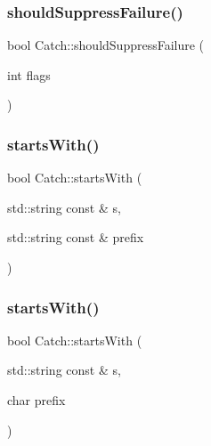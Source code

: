\mbox{\label{namespaceCatch_ab91eb13081203d634fe48d3d2ab386d7}} 
\subsubsection{\texorpdfstring{should\+Suppress\+Failure()}{shouldSuppressFailure()}}
{\footnotesize\ttfamily bool Catch\+::should\+Suppress\+Failure (\begin{DoxyParamCaption}\item[{int}]{flags }\end{DoxyParamCaption})}

\mbox{\label{namespaceCatch_a695f62327be0676e046291eeaae15110}} 
\subsubsection{\texorpdfstring{starts\+With()}{startsWith()}\hspace{0.1cm}{\footnotesize\ttfamily [1/2]}}
{\footnotesize\ttfamily bool Catch\+::starts\+With (\begin{DoxyParamCaption}\item[{std\+::string const \&}]{s,  }\item[{std\+::string const \&}]{prefix }\end{DoxyParamCaption})}

\mbox{\label{namespaceCatch_acad23751846ac23d0f379e34f5adebb1}} 
\subsubsection{\texorpdfstring{starts\+With()}{startsWith()}\hspace{0.1cm}{\footnotesize\ttfamily [2/2]}}
{\footnotesize\ttfamily bool Catch\+::starts\+With (\begin{DoxyParamCaption}\item[{std\+::string const \&}]{s,  }\item[{char}]{prefix }\end{DoxyParamCaption})}

